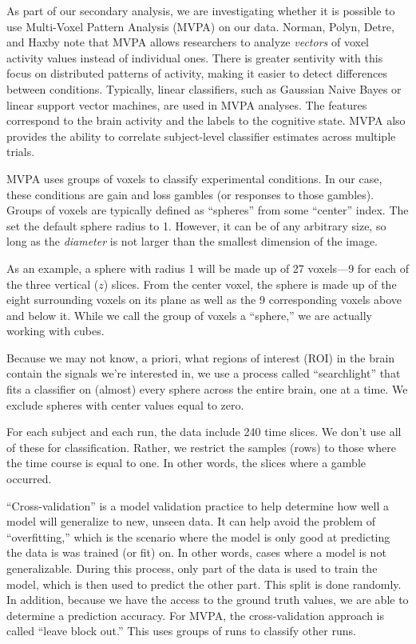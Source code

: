 \documentclass[11pt]{article}
\begin{document}
As part of our secondary analysis, we are investigating whether it is possible
to use Multi-Voxel Pattern Analysis (MVPA) on our data. Norman, Polyn, Detre,
and Haxby note that MVPA allows researchers to analyze \textit{vectors} of
voxel activity values instead of individual ones\cite{norman}. There is greater
sentivity with this focus on distributed patterns of activity, making it easier
to detect differences between conditions\cite{bvmvpa}. Typically, linear
classifiers, such as Gaussian Naive Bayes or linear support vector machines,
are used in MVPA analyses\cite{norman}. The features correspond to the brain
activity and the labels to the cognitive state. MVPA also provides the ability
to correlate subject-level classifier estimates across multiple
trials\cite{norman}.

MVPA uses groups of voxels to classify experimental conditions. In our case,
these conditions are gain and loss gambles (or responses to those gambles).
Groups of voxels are typically defined as ``spheres'' from some ``center''
index. The set the default sphere radius to 1. However, it can be of any
arbitrary size, so long as the \textit{diameter} is not larger than the
smallest dimension of the image.

As an example, a sphere with radius 1 will be made up of 27 voxels---9
for each of the three vertical (\(z\)) slices. From the center voxel, the
sphere is made up of the eight surrounding voxels on its plane as well as the
9 corresponding voxels above and below it. While we call the group of voxels a
``sphere,'' we are actually working with cubes.

Because we may not know, a priori, what regions of interest (ROI) in the brain
contain the signals we're interested in, we use a process called
``searchlight'' that fits a classifier on (almost) every sphere across the
entire brain, one at a time. We exclude spheres with center values equal to
zero.

For each subject and each run, the data include 240 time slices. We don't use
all of these for classification. Rather, we restrict the samples (rows) to
those where the time course is equal to one. In other words, the slices where a
gamble occurred.

``Cross-validation'' is a model validation practice to help determine how well
a model will generalize to new, unseen data. It can help avoid the problem of
``overfitting,'' which is the scenario where the model is only good at
predicting the data is was trained (or fit) on. In other words, cases where a
model is not generalizable. During this process, only part of the data is used
to train the model, which is then used to predict the other part. This split is
done randomly. In addition, because we have the access to the ground truth
values, we are able to determine a prediction accuracy. For MVPA, the
cross-validation approach is called ``leave block out.'' This uses groups of
runs to classify other runs.
\end{document}
